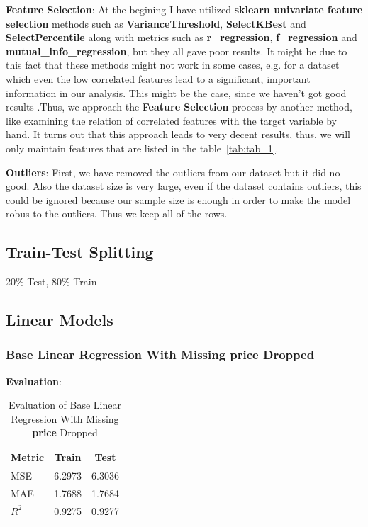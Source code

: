 \documentclass[a4paper,12pt]{article}
\begin{document}
\noindent\textbf{Feature Selection}: At the begining I have utilized \textbf{sklearn univariate feature selection} methods such as \textbf{VarianceThreshold}, \textbf{SelectKBest} and \textbf{SelectPercentile} along with metrics such as \textbf{r\_regression}, \textbf{f\_regression} and \textbf{mutual\_info\_regression}, but they all gave poor results. It might be due to this fact that these methods might not work in some cases, e.g. for a dataset which even the low correlated features lead to a significant, important information in our analysis. This might be the case, since we haven't got good results .Thus, we approach the \textbf{Feature Selection} process by another method, like examining the relation of correlated features with the target variable by hand. It turns out that this approach leads to very decent results, thus, we will only maintain features that are listed in the table~\ref{tab:tab_1}. 

\noindent\textbf{Outliers}: First, we have removed the outliers from our dataset but it did no good. Also the dataset size is very large, even if the dataset contains outliers, this could be ignored because our sample size is enough in order to make the model robus to the outliers. Thus we keep all of the rows.

\subsection*{Train-Test Splitting}
20\% Test, 80\% Train

\subsection*{Linear Models}

\subsubsection*{Base Linear Regression With Missing \textbf{price} Dropped}

\textbf{Evaluation}: 
\begin{table}[H]
    \centering
    \begin{tabular}{|l|c|c|}
    \hline
    \textbf{Metric} & \textbf{Train} & \textbf{Test} \\
    \hline
    MSE & 6.2973 & 6.3036 \\
    MAE & 1.7688 & 1.7684 \\
    $R^2$ & 0.9275 & 0.9277 \\
    \hline
    \end{tabular}
    \caption{Evaluation of Base Linear Regression With Missing \textbf{price} Dropped}
    \label{tab:tab_2}
\end{table}
\end{document}
